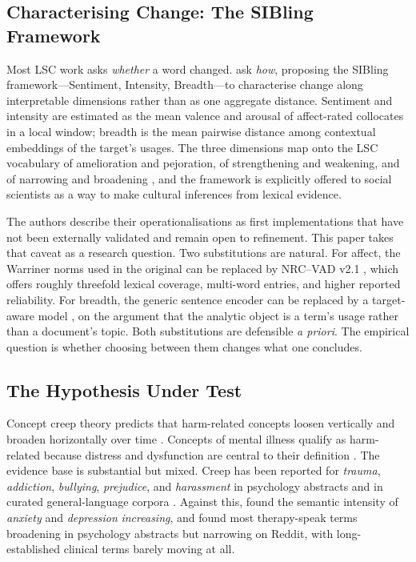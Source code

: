 \documentclass[final]{clv2025}
\begin{document}
\subsection{Characterising Change: The SIBling Framework}

Most LSC work asks \textit{whether} a word changed. \citet{baesMultidimensionalFrameworkEvaluating2024}
ask \textit{how}, proposing the SIBling framework---Sentiment, Intensity, Breadth---to characterise
change along interpretable dimensions rather than as one aggregate distance. Sentiment and
intensity are estimated as the mean valence and arousal of affect-rated collocates in a
local window; breadth is the mean pairwise distance among contextual embeddings of the
target's usages. The three dimensions map onto the LSC vocabulary of amelioration and
pejoration, of strengthening and weakening, and of narrowing and broadening
\citep{campbellHistoricalLinguisticsIntroduction2013}, and the framework is explicitly
offered to social scientists as a way to make cultural inferences from lexical evidence.

The authors describe their operationalisations as first implementations that have not been
externally validated and remain open to refinement. This paper takes that caveat as a
research question. Two substitutions are natural. For affect, the Warriner norms
\citep{warrinerNorms2013} used in the original can be replaced by NRC--VAD v2.1
\citep{mohammadNRCVADLexicon2025}, which offers roughly threefold lexical coverage,
multi-word entries, and higher reported reliability. For breadth, the generic sentence
encoder \citep{songMPNet2020,reimers-gurevych-2019-sentence} can be replaced by a
target-aware model \citep{cassottiXLLEXEMEWiCPretrained2023}, on the argument that the
analytic object is a term's usage rather than a document's topic. Both substitutions are
defensible \emph{a priori}. The empirical question is whether choosing between them
changes what one concludes.

\subsection{The Hypothesis Under Test}

Concept creep theory predicts that harm-related concepts loosen vertically and broaden
horizontally over time \citep{haslamConceptCreepPsychologys2016,haslamConceptCreepMental2026}.
Concepts of mental illness qualify as harm-related because distress and dysfunction are
central to their definition \citep{wakefieldConceptMentalDisorder1992}. The evidence base is
substantial but mixed. Creep has been reported for \emph{trauma}, \emph{addiction},
\emph{bullying}, \emph{prejudice}, and \emph{harassment} in psychology abstracts and in
curated general-language corpora
\citep{vylomovaSemanticChangesHarmrelated2021,baesSemanticShiftsMental2023}. Against this,
\citet{xiaoHaveConceptsAnxiety2023} found the semantic intensity of \emph{anxiety} and
\emph{depression} \emph{increasing}, and \citet{iacobComputationalAnalysisEmergence2026}
found most therapy-speak terms broadening in psychology abstracts but narrowing on Reddit,
with long-established clinical terms barely moving at all.
\end{document}

